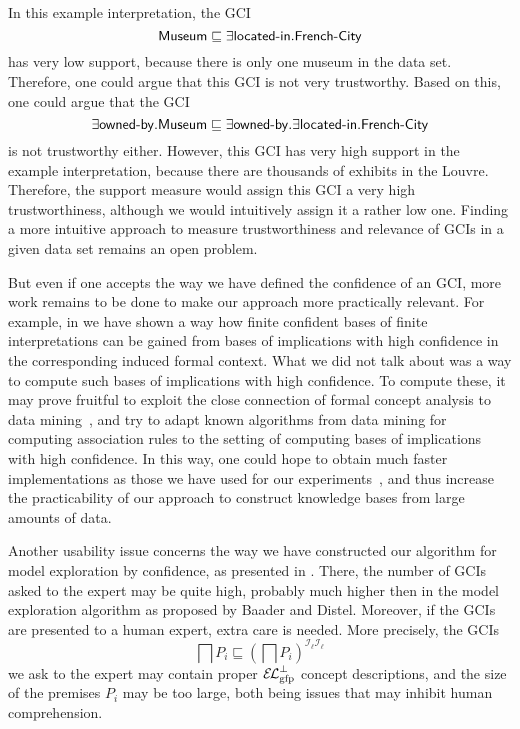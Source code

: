 In this example interpretation, the GCI
\begin{equation*}
  \mathsf{Museum} \sqsubseteq \exists \text{\textsf{located-in}}. \text{\textsf{French-City}}
\end{equation*}
has very low support, because there is only one museum in the data set.  Therefore, one
could argue that this GCI is not very trustworthy.  Based on this, one could argue that
the GCI
\begin{equation*}
  \exists \text{\textsf{owned-by}}. \mathsf{Museum} \sqsubseteq \exists
  \text{\textsf{owned-by}}. \exists \text{\textsf{located-in}}. \text{\textsf{French-City}}
\end{equation*}
is not trustworthy either.  However, this GCI has very high support in the example
interpretation, because there are thousands of exhibits in the Louvre.  Therefore, the
support measure would assign this GCI a very high trustworthiness, although we would
intuitively assign it a rather low one.  Finding a more intuitive approach to measure
trustworthiness and relevance of GCIs in a given data set remains an open problem.

But even if one accepts the way we have defined the confidence of an GCI, more work
remains to be done to make our approach more practically relevant.  For example, in
 we have shown a
way how finite confident bases of finite interpretations can be gained from bases of
implications with high confidence in the corresponding induced formal context.  What we
did not talk about was a way to compute such bases of implications with high confidence.
To compute these, it may prove fruitful to exploit the close connection of formal concept
analysis to data mining~\cite{arules:Zaki:1998}, and try to adapt known algorithms from
data mining for computing association rules to the setting of computing bases of
implications with high confidence.  In this way, one could hope to obtain much faster
implementations as those we have used for our
experiments~\cite{DBLP:conf/icdm/BorchmannD11}, and thus increase the practicability of
our approach to construct knowledge bases from large amounts of data.

Another usability issue concerns the way we have constructed our algorithm for model
exploration by confidence, as presented in .  There, the number
of GCIs asked to the expert may be quite high, probably much higher then in the model
exploration algorithm as proposed by Baader and Distel.  Moreover, if the GCIs are
presented to a human expert, extra care is needed.  More precisely, the GCIs
\begin{equation*}
  \bigsqcap P_{i} \sqsubseteq (\bigsqcap P_{i})^{\mathcal{I}_{\ell}\mathcal{I}_{\ell}}
\end{equation*}
we ask to the expert may contain proper $\ELgfpbot$ concept descriptions, and the size of
the premises $P_{i}$ may be too large, both being issues that may inhibit human
comprehension.

